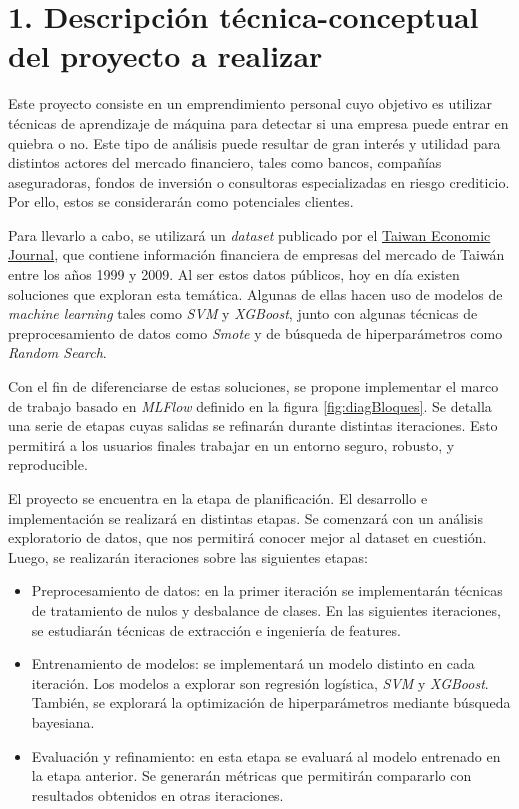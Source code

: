 \documentclass[
11pt, %
]{charter}
\begin{document}
\section{1. Descripción técnica-conceptual del proyecto a realizar}
\label{sec:descripcion}

Este proyecto consiste en un emprendimiento personal cuyo objetivo es utilizar técnicas de aprendizaje de máquina para detectar si una empresa puede entrar en quiebra o no. Este tipo de análisis puede resultar de gran interés y utilidad para distintos actores del mercado financiero, tales como bancos, compañías aseguradoras, fondos de inversión o consultoras especializadas en riesgo crediticio. Por ello, estos se considerarán como potenciales clientes.

Para llevarlo a cabo, se utilizará un \textit{dataset} publicado por el \href{https://www.tejwin.com/en/}{Taiwan Economic Journal}, que contiene información financiera de empresas del mercado de Taiwán entre los años 1999 y 2009. Al ser estos datos públicos, hoy en día existen soluciones que exploran esta temática. Algunas de ellas hacen uso de modelos de \textit{machine learning} tales como \textit{SVM} y \textit{XGBoost}, junto con algunas técnicas de preprocesamiento de datos como \textit{Smote} y de búsqueda de hiperparámetros como \textit{Random Search}.

Con el fin de diferenciarse de estas soluciones, se propone implementar el marco de trabajo basado en \textit{MLFlow} definido en la figura \ref{fig:diagBloques}. Se detalla una serie de etapas cuyas salidas se refinarán durante distintas iteraciones. Esto permitirá a los usuarios finales trabajar en un entorno seguro, robusto, y reproducible.

El proyecto se encuentra en la etapa de planificación. El desarrollo e implementación se realizará en distintas etapas. Se comenzará con un análisis exploratorio de datos, que nos permitirá conocer mejor al dataset en cuestión. Luego, se realizarán iteraciones sobre las siguientes etapas:

\begin{itemize}
	\item Preprocesamiento de datos: en la primer iteración se implementarán técnicas de tratamiento de nulos y desbalance de clases. En las siguientes iteraciones, se estudiarán técnicas de extracción e ingeniería de features.
	\item Entrenamiento de modelos: se implementará un modelo distinto en cada iteración. Los modelos a explorar son regresión logística, \textit{SVM} y \textit{XGBoost}. También, se explorará la optimización de hiperparámetros mediante búsqueda bayesiana.
	\item Evaluación y refinamiento: en esta etapa se evaluará al modelo entrenado en la etapa anterior. Se generarán métricas que permitirán compararlo con resultados obtenidos en otras iteraciones.
\end{itemize}
\end{document}

